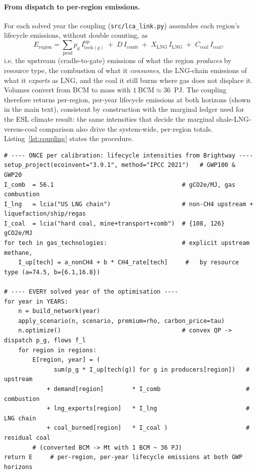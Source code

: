 \documentclass[11pt]{article}
\begin{document}
\paragraph{From dispatch to per-region emissions.} For each solved year the
coupling (\texttt{src/lca\_link.py}) assembles each region's lifecycle
emissions, without double counting, as
\begin{equation}
E_{\mathrm{region}} = \sum_{\mathrm{prod}} p_g\,I^{\mathrm{up}}_{\mathrm{tech}(g)}
 \;+\; D\,I_{\mathrm{comb}} \;+\; X_{\mathrm{LNG}}\,I_{\mathrm{LNG}}
 \;+\; C_{\mathrm{coal}}\,I_{\mathrm{coal}},
\end{equation}
i.e. the upstream (cradle-to-gate) emissions of what the region \emph{produces}
by resource type, the combustion of what it \emph{consumes}, the LNG-chain
emissions of what it \emph{exports} as LNG, and the coal it still burns where
gas does not displace it. Volumes convert from BCM to mass with
$1~\mathrm{BCM}\approx36$~PJ. The coupling therefore returns per-region,
per-year lifecycle emissions at both horizons (shown in the main text),
consistent by construction with the
marginal ledger used for the ESL climate result: the same intensities that
decide the marginal shale-LNG-versus-coal comparison also drive the system-wide,
per-region totals. Listing~\ref{lst:coupling} states the procedure.

\begin{lstlisting}[style=coupling, caption={The PyPSA\,$\times$\,Brightway
coupling, in pseudocode. The Brightway inventory is characterised once (lines
2--7); each solved year of the trade optimisation is mapped to per-region
lifecycle emissions by a linear application of those intensities to the
dispatch (lines 9--21).}, label={lst:coupling}]
# ---- ONCE per calibration: lifecycle intensities from Brightway ----
setup_project(ecoinvent="3.9.1", method="IPCC 2021")   # GWP100 & GWP20
I_comb  = 56.1                                    # gCO2e/MJ, gas combustion
I_lng   = lcia("US LNG chain")                    # non-CH4 upstream + liquefaction/ship/regas
I_coal  = lcia("hard coal, mine+transport+comb")  # {108, 126} gCO2e/MJ
for tech in gas_technologies:                     # explicit upstream methane,
    I_up[tech] = a_nonCH4 + b * CH4_rate[tech]     #   by resource type (a=74.5, b={6.1,16.8})

# ---- EVERY solved year of the optimisation ----
for year in YEARS:
    n = build_network(year)
    apply_scenario(n, scenario, premium=rho, carbon_price=tau)
    n.optimize()                                  # convex QP -> dispatch p_g, flows f_l
    for region in regions:
        E[region, year] = (
              sum(p_g * I_up[tech(g)] for g in producers[region])   # upstream
            + demand[region]        * I_comb                        # combustion
            + lng_exports[region]   * I_lng                         # LNG chain
            + coal_burned[region]   * I_coal )                      # residual coal
        # (converted BCM -> Mt with 1 BCM ~ 36 PJ)
return E     # per-region, per-year lifecycle emissions at both GWP horizons
\end{lstlisting}
\end{document}
